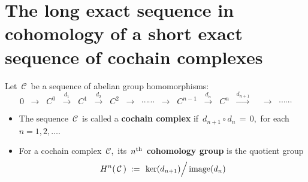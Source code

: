 

\section{The long exact sequence in cohomology of a short exact sequence of cochain complexes}
\setcounter{theorem}{0}
\setcounter{equation}{0}


\renewcommand{\theenumi}{\roman{enumi}}
\renewcommand{\labelenumi}{\textnormal{(\theenumi)}$\;\;$}


\begin{definition}
\mbox{}
\vskip 0.1cm
\noindent
Let \,$\mathcal{C}$\, be a sequence of abelian group homomorphisms:
\begin{equation*}
0
\;\; \longrightarrow \;\;
	C^{0}
\;\; \overset{d_{1}}{\longrightarrow} \;\;
	C^{1}
\;\; \overset{d_{2}}{\longrightarrow} \;\;
	C^{2}
\;\; \longrightarrow \;\;
	\cdots\cdots
\;\; \longrightarrow \;\;
	C^{n-1}
\;\; \overset{d_{n}}{\longrightarrow} \;\;
	C^{n}
\;\; \overset{d_{n+1}}{\longrightarrow} \;\;
\;\; \longrightarrow \;\;
	\cdots\cdots
\end{equation*}
\begin{itemize}
\item
	The sequence \,$\mathcal{C}$\, is called a \textbf{cochain complex} if
	\,$d_{n+1} \circ d_{n} \,=\, 0$,\, for each \,$n = 1, 2, \ldots$.\,
\item
	For a cochain complex \,$\mathcal{C}$,\, its \,\textbf{$n^{\textnormal{th}}$ cohomology group}
	is the quotient group
	\begin{equation*}
	H^{n}(\,\mathcal{C}\,)
	\; := \;
		\left.\overset{{\color{white}.}}{\ker(d_{n+1})}\right/\image(d_{n})
	\end{equation*}
\end{itemize}
\end{definition}


